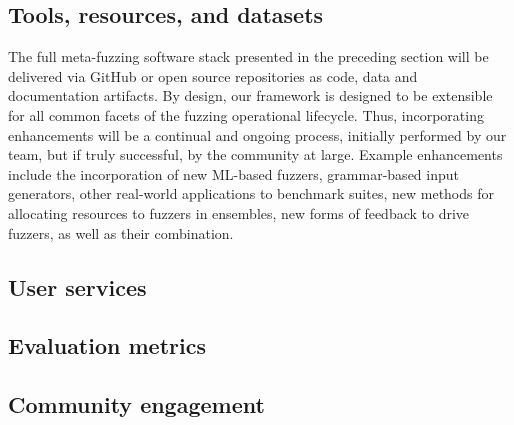 \subsection{Tools, resources, and datasets}
The full meta-fuzzing software stack presented in the preceding section will be delivered via GitHub or open source repositories as code, 
data and documentation artifacts. By design, our framework is designed to be extensible for all common facets of the fuzzing operational lifecycle. 
Thus, incorporating enhancements
will be a continual and ongoing process, initially performed by our team, but if truly successful, by the community at large. 
Example enhancements include the incorporation of new ML-based fuzzers, grammar-based input generators, 
other real-world applications to benchmark suites, new methods for allocating resources to fuzzers in ensembles, 
new forms of feedback to drive fuzzers, as well as their combination.


\subsection{User services}
\label{sec:user-services}


\subsection{Evaluation metrics}


\subsection{Community engagement}


